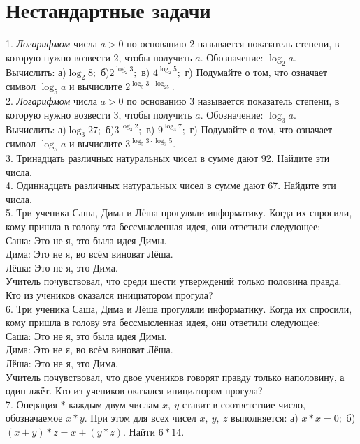 \section{Нестандартные задачи}
1. {\it Логарифмом} числа $a>0$ по основанию 2 называется показатель степени, в которую нужно возвести 2, чтобы получить $a.$ Обозначение: $\log_2 a.$\\
Вычислить: а)$\log_2 8;$ б)$2^{\log_2 3};$ в) $4^{\log_2 5};$ г) Подумайте о том, что означает символ $\log_5 a$ и вычислите $2^{\log_5 3\cdot\log_25}.$\\
2. {\it Логарифмом} числа $a>0$ по основанию 3 называется показатель степени, в которую нужно возвести 3, чтобы получить $a.$ Обозначение: $\log_3 a.$\\
Вычислить: а)$\log_3 27;$ б)$3^{\log_3 2};$ в) $9^{\log_3 7};$ г) Подумайте о том, что означает символ $\log_5 a$ и вычислите $3^{\log_5 3\cdot\log_3 5}.$\\
3. Тринадцать различных натуральных чисел в сумме дают 92. Найдите эти числа.\\
4. Одиннадцать различных натуральных чисел в сумме дают 67. Найдите эти числа.\\
5. Три ученика Саша, Дима и Лёша прогуляли информатику. Когда их спросили, кому пришла в голову эта бессмысленная идея, они ответили следующее:\\
Саша: Это не я, это была идея Димы.\\
Дима: Это не я, во всём виноват Лёша.\\
Лёша: Это не я, это Дима.\\
Учитель почувствовал, что среди шести утверждений только половина правда. Кто из учеников оказался инициатором прогула?\\
6. Три ученика Саша, Дима и Лёша прогуляли информатику. Когда их спросили, кому пришла в голову эта бессмысленная идея, они ответили следующее:\\
Саша: Это не я, это была идея Димы.\\
Дима: Это не я, во всём виноват Лёша.\\
Лёша: Это не я, это Дима.\\
Учитель почувствовал, что двое учеников говорят правду только наполовину, а один лжёт. Кто из учеников оказался инициатором прогула?\\
7. Операция $*$ каждым двум числам $x,\ y$ ставит в соответствие число, обозначаемое $x*y.$ При этом для всех чисел $x,\ y,\ z$ выполняется: а) $x*x=0;$ б) $(x+y)*z=x+(y*z).$ Найти $6*14.$\\
